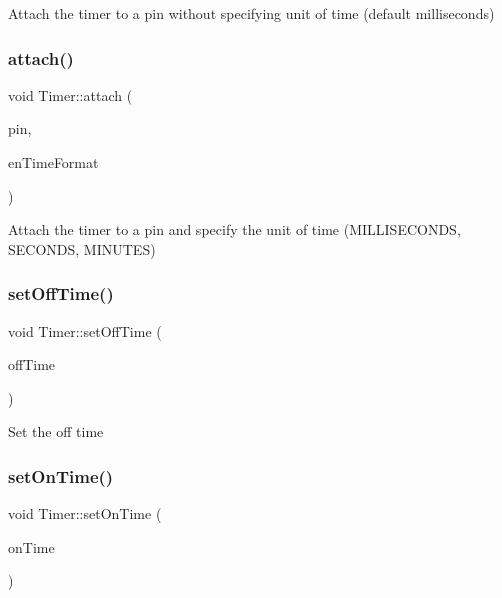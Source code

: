 Attach the timer to a pin without specifying unit of time (default milliseconds)\hypertarget{class_timer_ac780d2ae2072d2d2be6bdc8bcc0a3acc}{}\label{class_timer_ac780d2ae2072d2d2be6bdc8bcc0a3acc} 
\subsubsection{\texorpdfstring{attach()}{attach()}\hspace{0.1cm}{\footnotesize\ttfamily [2/2]}}
{\footnotesize\ttfamily void Timer\+::attach (\begin{DoxyParamCaption}\item[{int}]{pin,  }\item[{\hyperlink{_timer_8h_add9fe45e09605eee3e4a39c8a5c4476d}{Time\+Unit}}]{en\+Time\+Format }\end{DoxyParamCaption})}

Attach the timer to a pin and specify the unit of time (M\+I\+L\+L\+I\+S\+E\+C\+O\+N\+DS, S\+E\+C\+O\+N\+DS, M\+I\+N\+U\+T\+ES)\hypertarget{class_timer_a47474fcf4efcc8dfd7540b1a7b80b4ce}{}\label{class_timer_a47474fcf4efcc8dfd7540b1a7b80b4ce} 
\subsubsection{\texorpdfstring{set\+Off\+Time()}{setOffTime()}}
{\footnotesize\ttfamily void Timer\+::set\+Off\+Time (\begin{DoxyParamCaption}\item[{unsigned long}]{off\+Time }\end{DoxyParamCaption})}

Set the off time\hypertarget{class_timer_a3ec9029748dc5408795d59841497a254}{}\label{class_timer_a3ec9029748dc5408795d59841497a254} 
\subsubsection{\texorpdfstring{set\+On\+Time()}{setOnTime()}}
{\footnotesize\ttfamily void Timer\+::set\+On\+Time (\begin{DoxyParamCaption}\item[{unsigned long}]{on\+Time }\end{DoxyParamCaption})}


